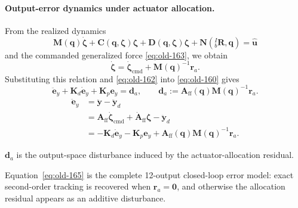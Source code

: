 \documentclass[12pt,a4paper]{report}
\newcommand{\newsymbols}[1]{\par\noindent{}#1\par\vspace{0.35em}}
\newcommand{\formulaannotation}[1]{\par\noindent{}#1\par\vspace{0.35em}}
\begin{document}
\paragraph{Output-error dynamics under actuator allocation.}
From the realized dynamics
\begin{equation}
\mathbf{M}(\mathbf{q})\dot{\boldsymbol{\zeta}} +
\mathbf{C}(\mathbf{q},\boldsymbol{\zeta})\boldsymbol{\zeta} +
\mathbf{D}(\mathbf{q},\boldsymbol{\zeta})\boldsymbol{\zeta} +
\mathbf{N}({}_{b}^{I}\mathbf{R},\mathbf{q}) = \hat{\mathbf{u}}
\end{equation}
and the commanded generalized force \eqref{eq:old-163}, we obtain
\begin{equation}
\dot{\boldsymbol{\zeta}}
=
\dot{\boldsymbol{\zeta}}_{\mathrm{cmd}}
+
\mathbf{M}(\mathbf{q})^{-1}\mathbf{r}_{a}.
\end{equation}
Substituting this relation and \eqref{eq:old-162} into \eqref{eq:old-160} gives
\begin{equation}
\ddot{\mathbf{e}}_y +
\mathbf{K}_d \dot{\mathbf{e}}_y +
\mathbf{K}_p \mathbf{e}_y
=
\mathbf{d}_{a},
\qquad
\mathbf{d}_{a}
:=
\mathbf{A}_{\mathrm{ff}}(\mathbf{q})
\mathbf{M}(\mathbf{q})^{-1}\mathbf{r}_{a}.
\label{eq:old-165}
\end{equation}
\begin{equation}
\begin{aligned}
\ddot{\mathbf{e}}_y
&= \ddot{\mathbf{y}} - \ddot{\mathbf{y}}_d \\
&= 
\mathbf{A}_{\mathrm{ff}}\dot{\boldsymbol{\zeta}}_{\mathrm{cmd}}
+ \dot{\mathbf{A}}_{\mathrm{ff}}\boldsymbol{\zeta}
- \ddot{\mathbf{y}}_d \\
&= 
-\mathbf{K}_d\dot{\mathbf{e}}_y
-\mathbf{K}_p\mathbf{e}_y
+ \mathbf{A}_{\mathrm{ff}}(\mathbf{q})
\mathbf{M}(\mathbf{q})^{-1}\mathbf{r}_{a}.
\end{aligned}
\end{equation}
\newsymbols{$\mathbf{d}_{a}$ is the output-space disturbance induced by the actuator-allocation residual.}
\formulaannotation{Equation~\eqref{eq:old-165} is the complete 12-output closed-loop error model: exact second-order tracking is recovered when $\mathbf{r}_a=\mathbf{0}$, and otherwise the allocation residual appears as an additive disturbance.}
\end{document}
